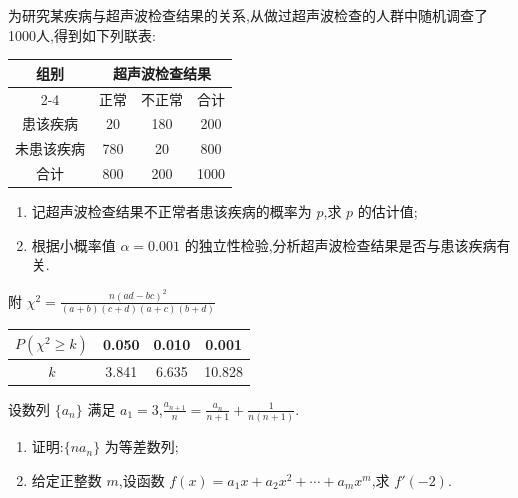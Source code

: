 \begin{problem}
为研究某疾病与超声波检查结果的关系,从做过超声波检查的人群中随机调查了1000人,得到如下列联表:

\begin{center}
\begin{tabular}{|c|c|c|c|}
\hline
\multicolumn{1}{|c|}{组别} & \multicolumn{3}{c|}{超声波检查结果} \\
\cline{2-4}
 & 正常 & 不正常 & 合计 \\
\hline
患该疾病 & 20 & 180 & 200 \\
\hline
未患该疾病 & 780 & 20 & 800 \\
\hline
合计 & 800 & 200 & 1000 \\
\hline
\end{tabular}
\end{center}

\begin{enumerate}
\item 记超声波检查结果不正常者患该疾病的概率为 \(p\),求 \(p\) 的估计值;
\item 根据小概率值 \(\alpha = 0.001\) 的独立性检验,分析超声波检查结果是否与患该疾病有关.
\end{enumerate}

附 \(\chi^2 = \frac{n(ad-bc)^2}{(a+b)(c+d)(a+c)(b+d)}\)

\begin{center}
\begin{tabular}{|c|c|c|c|}
\hline
\(P(\chi^2 \ge k)\) & 0.050 & 0.010 & 0.001 \\
\hline
\(k\) & 3.841 & 6.635 & 10.828 \\
\hline
\end{tabular}
\end{center}
\end{problem}

\begin{problem}
设数列 \(\{a_n\}\) 满足 \(a_1 = 3\),\(\frac{a_{n+1}}{n} = \frac{a_n}{n+1} + \frac{1}{n(n+1)}\).

\begin{enumerate}
\item 证明:\(\{na_n\}\) 为等差数列;
\item 给定正整数 \(m\),设函数 \(f(x) = a_1x + a_2x^2 + \cdots + a_mx^m\),求 \(f'(-2)\).
\end{enumerate}
\end{problem}

